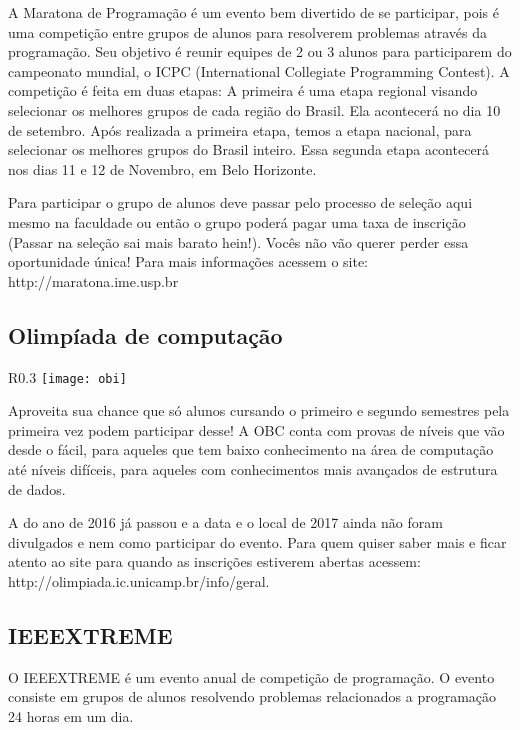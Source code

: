 A Maratona de Programação é um evento bem divertido de se participar, pois é uma competição entre grupos de alunos para resolverem problemas através da programação. Seu objetivo é reunir equipes de 2 ou 3 alunos para participarem do campeonato mundial, o ICPC (International Collegiate Programming Contest). A competição é feita em duas etapas: A primeira é uma etapa regional visando selecionar os melhores grupos de cada região do Brasil. Ela acontecerá no dia 10 de setembro. Após realizada a primeira etapa, temos a etapa nacional, para selecionar os melhores grupos do Brasil inteiro. Essa segunda etapa acontecerá nos dias 11 e 12 de Novembro, em Belo Horizonte.

	Para participar o grupo de alunos deve passar pelo processo de seleção aqui mesmo na faculdade ou então o grupo poderá pagar uma taxa de inscrição (Passar na seleção sai mais barato hein!). Vocês não vão querer perder essa oportunidade única! Para mais informações acessem o site: http://maratona.ime.usp.br
    
\subsection {Olimpíada de computação} 
                 \begin{wrapfigure}{R}{0.3\textwidth}
	                    \centering
                        \texttt{[image: obi]}
                     \end{wrapfigure}  

Aproveita sua chance que só alunos cursando o primeiro e segundo semestres pela primeira vez podem participar desse! A OBC conta com provas de níveis que vão desde o fácil, para aqueles que tem baixo conhecimento na área de computação até níveis difíceis, para aqueles com conhecimentos mais avançados de estrutura de dados.

	            A do ano de 2016 já passou e a data e o local de 2017 ainda não foram divulgados e nem como participar do evento. Para quem quiser saber mais e ficar atento ao site para quando as inscrições 
	            estiverem abertas acessem: http://olimpiada.ic.unicamp.br/info/geral.

\subsection {IEEEXTREME} 

O IEEEXTREME é um evento anual de competição de programação. O evento consiste em grupos de alunos resolvendo problemas relacionados a programação 24 horas em um dia.

